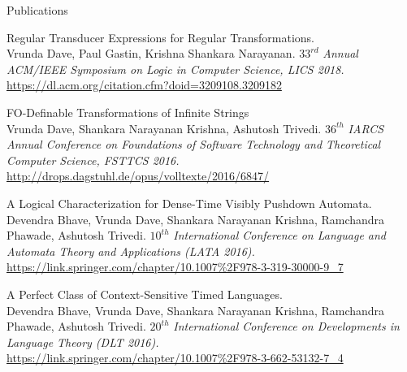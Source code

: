 \documentclass{resume} %
\begin{document}
\begin{rSection}{Publications}
	\begin{rSubsection}{}{}{}{}
	\item Regular Transducer Expressions for Regular Transformations. \\
	Vrunda Dave, Paul Gastin, Krishna Shankara Narayanan. 
	$\mathit{33}^{rd}$
	\textit{Annual ACM/IEEE Symposium on Logic in Computer Science, LICS 2018.}
	 \url{https://dl.acm.org/citation.cfm?doid=3209108.3209182} 
	
	\item FO-Definable Transformations of Infinite Strings \\
	Vrunda Dave, Shankara Narayanan Krishna, Ashutosh Trivedi.
	$\mathit{36}^{th}$
	\textit{IARCS Annual Conference on Foundations of Software Technology and Theoretical Computer Science, FSTTCS 2016.} \url{http://drops.dagstuhl.de/opus/volltexte/2016/6847/}
	
	\item A Logical Characterization for Dense-Time Visibly Pushdown Automata.
	\newline Devendra Bhave, Vrunda Dave, Shankara Narayanan Krishna, Ramchandra Phawade, Ashutosh Trivedi. 
	$\mathit{10}^{th}$ \textit{International Conference on Language and Automata Theory and Applications (LATA 2016).} \url{https://link.springer.com/chapter/10.1007\%2F978-3-319-30000-9_7}
	
	\item A Perfect Class of Context-Sensitive Timed Languages. \\
	Devendra Bhave, Vrunda Dave, Shankara Narayanan Krishna, Ramchandra Phawade, Ashutosh Trivedi. 
	$\mathit{20}^{th}$ \textit{International Conference on Developments in Language Theory (DLT 2016).} \url{https://link.springer.com/chapter/10.1007\%2F978-3-662-53132-7_4} 

	\end{rSubsection}

\end{rSection}

%		
%		
%	
\pagebreak
\end{document}
